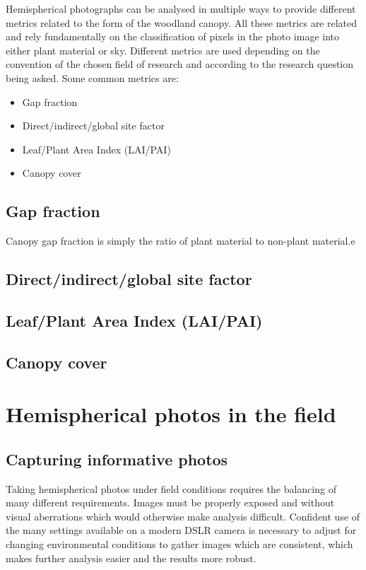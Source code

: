 \documentclass{article}
\begin{document}
Hemispherical photographs can be analysed in multiple ways to provide different metrics related to the form of the woodland canopy. All these metrics are related and rely fundamentally on the classification of pixels in the photo image into either plant material or sky. Different metrics are used depending on the convention of the chosen field of research and according to the research question being asked. Some common metrics are:

\begin{itemize}
	\item{Gap fraction}
	\item{Direct/indirect/global site factor}
	\item{Leaf/Plant Area Index (LAI/PAI)}
	\item{Canopy cover}
\end{itemize}

\subsection{Gap fraction}

Canopy gap fraction is simply the ratio of plant material to non-plant material.e 

\subsection{Direct/indirect/global site factor}

\subsection{Leaf/Plant Area Index (LAI/PAI)}

\subsection{Canopy cover}

\section{Hemispherical photos in the field}

\subsection{Capturing informative photos}

Taking hemispherical photos under field conditions requires the balancing of many different requirements. Images must be properly exposed and without visual aberrations which would otherwise make analysis difficult. Confident use of the many settings available on a modern DSLR camera is necessary to adjust for changing environmental conditions to gather images which are consistent, which makes further analysis easier and the results more robust.
\end{document}
